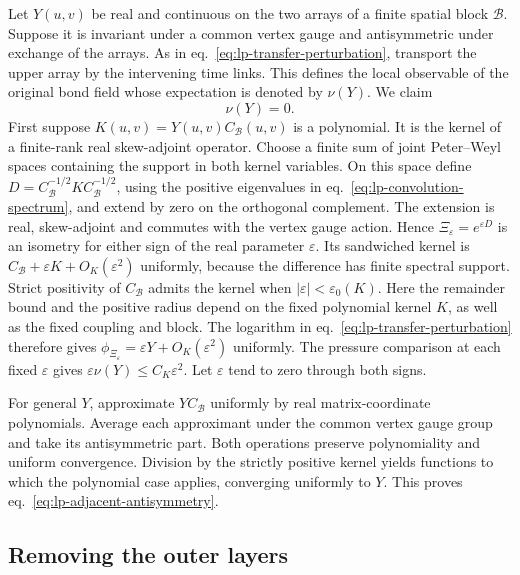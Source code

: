 \documentclass[11pt,letterpaper,reqno]{amsart}
\numberwithin{equation}{section}
\renewcommand{\eqref}[1]{\textup{eq.~\ref{#1}}}
\theoremstyle{definition}
\theoremstyle{remark}
\begin{document}
Let \(Y(u,v)\) be real and continuous on the two arrays of a finite
spatial block \(\mathcal B\). Suppose it is invariant under a common
vertex gauge and antisymmetric under exchange of the arrays.
As in \eqref{eq:lp-transfer-perturbation}, transport the upper array
by the intervening time links. This defines the local observable of
the original bond field whose expectation is denoted by \(\nu(Y)\).
We claim
\begin{equation}\label{eq:lp-adjacent-antisymmetry}
                           \nu(Y)=0 .
\end{equation}
First suppose \(K(u,v)=Y(u,v)C_{\mathcal B}(u,v)\) is a polynomial.
It is the kernel of a finite-rank real skew-adjoint operator.
Choose a finite sum of joint Peter--Weyl spaces containing the
support in both kernel variables. On this space define
\(D=C_{\mathcal B}^{-1/2}K C_{\mathcal B}^{-1/2}\), using the
positive eigenvalues in \eqref{eq:lp-convolution-spectrum}, and
extend by zero on the orthogonal complement. The extension is real,
skew-adjoint and commutes with the vertex gauge action. Hence
\(\Xi_\varepsilon=e^{\varepsilon D}\) is an isometry for either
sign of the real parameter \(\varepsilon\). Its sandwiched kernel
is \(C_{\mathcal B}+\varepsilon K+O_K(\varepsilon^2)\) uniformly,
because the difference has finite spectral support. Strict
positivity of \(C_{\mathcal B}\) admits the kernel when
\(|\varepsilon|<\varepsilon_0(K)\). Here the remainder bound and
the positive radius depend on the fixed polynomial kernel \(K\),
as well as the fixed coupling and block. The logarithm in \eqref{eq:lp-transfer-perturbation}
therefore gives \(\phi_{\Xi_\varepsilon}=\varepsilon Y+O_K(\varepsilon^2)\)
uniformly. The pressure comparison at each fixed \(\varepsilon\)
gives \(\varepsilon\nu(Y)\le C_K\varepsilon^2\).
Let \(\varepsilon\) tend to zero through both signs.

For general \(Y\), approximate \(Y C_{\mathcal B}\) uniformly by
real matrix-coordinate polynomials. Average each approximant
under the common vertex gauge group and take its antisymmetric
part. Both operations preserve polynomiality and uniform convergence.
Division by the strictly positive kernel yields functions to which
the polynomial case applies, converging uniformly to \(Y\).
This proves \eqref{eq:lp-adjacent-antisymmetry}.

\subsection{Removing the outer layers}
\end{document}
